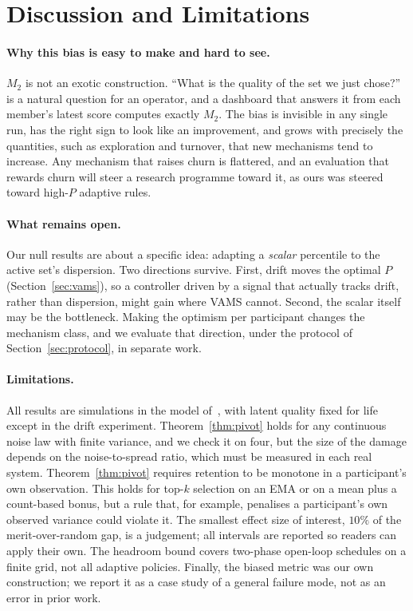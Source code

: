 \documentclass[sigconf,anonymous,review,nonacm]{acmart}
\begin{document}
\section{Discussion and Limitations}

\paragraph{Why this bias is easy to make and hard to see.} $M_2$ is not an exotic
construction. ``What is the quality of the set we just chose?'' is a natural question for an
operator, and a dashboard that answers it from each member's latest score computes exactly
$M_2$. The bias is invisible in any single run, has the right sign to look like an
improvement, and grows with precisely the quantities, such as exploration and turnover,
that new mechanisms tend to increase. Any mechanism that raises churn is flattered, and an
evaluation that rewards churn will steer a research programme toward it, as ours was
steered toward high-$P$ adaptive rules.

\paragraph{What remains open.} Our null results are about a specific idea: adapting a
\emph{scalar} percentile to the active set's dispersion. Two directions survive. First,
drift moves the optimal $P$ (Section~\ref{sec:vams}), so a controller driven by a signal
that actually tracks drift, rather than dispersion, might gain where VAMS cannot. Second,
the scalar itself may be the bottleneck. Making the optimism per participant changes the
mechanism class, and we evaluate that direction, under the protocol of
Section~\ref{sec:protocol}, in separate work.

\paragraph{Limitations.} All results are simulations in the model
of~\cite{kruijssen2024}, with latent quality fixed for life except in the drift experiment.
Theorem~\ref{thm:pivot} holds for any continuous noise law with finite variance, and we
check it on four, but the size of the damage depends on the noise-to-spread ratio, which
must be measured in each real system. Theorem~\ref{thm:pivot} requires retention to
be monotone in a participant's own observation. This holds for top-$k$ selection on an EMA
or on a mean plus a count-based bonus, but a rule that, for example, penalises a
participant's own observed variance could violate it. The smallest effect size of interest,
$10\%$ of the merit-over-random gap, is a judgement; all intervals are reported so readers
can apply their own. The headroom bound covers two-phase open-loop schedules on a finite
grid, not all adaptive policies. Finally, the biased metric was our own construction; we
report it as a case study of a general failure mode, not as an error in prior work.
\end{document}
